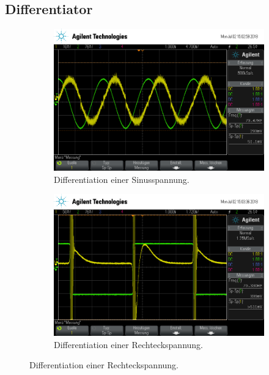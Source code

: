 \subsection{Differentiator}
\begin{figure}[ht]
  \centering
  
  \caption{}
  \label{fig:}
\end{figure}
\begin{figure}[ht]
  \centering
  \begin{subfigure}[]{\textwidth}
    \centering
    \includegraphics[height=0.3\textheight]{data/scope_265.png}
    \caption{Differentiation einer Sinusspannung.}
    \label{subfig:dif_sinus}
  \end{subfigure}
  \begin{subfigure}[]{\textwidth}
    \centering
    \includegraphics[height=0.3\textheight]{data/scope_266.png}
    \caption{Differentiation einer Rechteckspannung.}

\end{subfigure}
\end{figure}

